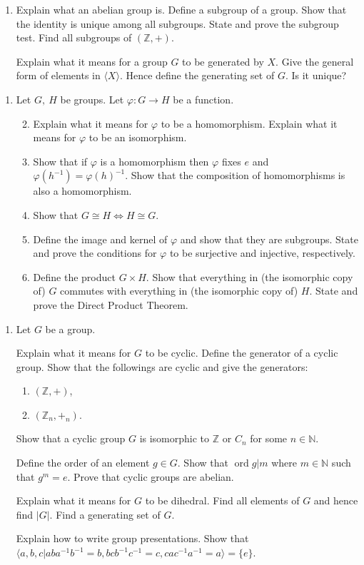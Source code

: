 \documentclass[11pt]{article}
\newlength{\qspace}
\newcounter{qnumber}
\newenvironment{question}%
 {\vspace{\qspace}
  \begin{enumerate}[\bfseries 1\quad][10]%
    \setcounter{enumi}{\value{qnumber}}%
    \item%
 }
{
  \end{enumerate}
  \filbreak
  \stepcounter{qnumber}
 }
\newenvironment{questionparts}[1][1]%
 {
  \begin{enumerate}[\bfseries (i)]%
    \setcounter{enumii}{#1}
    \addtocounter{enumii}{-1}
    \setlength{\parskip}{3pt}
 }
 {
  \end{enumerate}
 }
\begin{document}
\begin{question}
Explain what an abelian group is. Define a subgroup of a group. Show that the identity is unique among all subgroups. State and prove the subgroup test.
Find all subgroups of $ (\mathbb{Z} ,+) $.

Explain what it means for a group $G$ to be generated by $X$. Give the general form of elements in $ \langle X \rangle  $. Hence define the generating set of $G$. Is it unique?
\end{question}

\begin{question}
  Let $ G,\ H $ be groups. Let $ \varphi: G\to H $ be a function.

  \begin{questionparts}
    \item Explain what it means for $ \varphi $ to be a homomorphism. Explain what it means for $ \varphi $ to be an isomorphism.
    \item Show that if $ \varphi $ is a homomorphism then $ \varphi $ fixes $e$ and $ \varphi (h^{-1})=\varphi (h)^{-1} $. Show that the composition of homomorphisms is also a homomorphism.
    \item Show that $ G \cong H \Leftrightarrow H \cong G $.
    \item Define the image and kernel of $ \varphi $ and show that they are subgroups. State and prove the conditions for $ \varphi $ to be surjective and injective, respectively.
    \item Define the product $ G \times H $. Show that everything in (the isomorphic copy of) $G$ commutes with everything in (the isomorphic copy of) $H$. State and prove the Direct Product Theorem.
  \end{questionparts}
\end{question}
\begin{question}
  Let $G$ be a group. 
  
  Explain what it means for $G$ to be cyclic. Define the generator of a cyclic group. Show that the followings are cyclic and give the generators:
    \begin{enumerate}
      \item $ (\mathbb{Z} ,+) $,
      \item $ (\mathbb{Z}_n, +_n) $.
    \end{enumerate}
  
  Show that a cyclic group $G$ is isomorphic to $ \mathbb{Z}  $ or $ C_n $ for some $ n\in \mathbb{N} $.

  Define the order of an element $ g\in G $. Show that $ \operatorname{ord} g |m$ where $ m\in \mathbb{N} $ such that $ g^m=e $. Prove that cyclic groups are abelian.

  Explain what it means for $G$ to be dihedral. Find all elements of $G$ and hence find $ |G| $. Find a generating set of $G$.

  Explain how to write group presentations. Show that $ \langle a,b,c| aba^{-1}b^{-1}=b, bcb^{-1}c^{-1}=c, cac^{-1}a^{-1}=a \rangle=\{e\} $.
\end{question}
\end{document}
